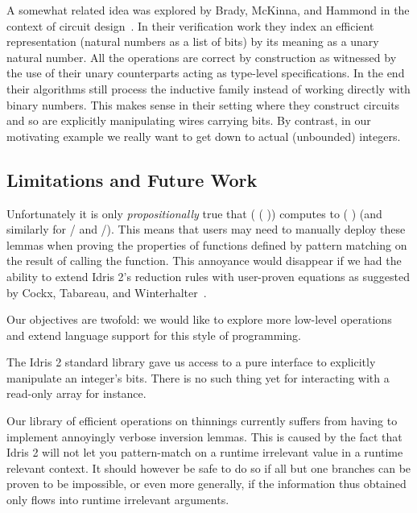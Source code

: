 \documentclass{article}
\newcommand{\idris}{Idris 2}
\begin{document}
A somewhat related idea was explored by Brady, McKinna, and Hammond in the context of
circuit design~\cite{DBLP:conf/sfp/BradyMH07}. In their verification work they index
an efficient representation (natural numbers as a list of bits) by its meaning as a
unary natural number. All the operations are correct by construction as witnessed by
the use of their unary counterparts acting as type-level specifications.
%
In the end their algorithms still process the inductive family instead of working
directly with binary numbers. This makes sense in their setting where they construct
circuits and so are explicitly manipulating wires carrying bits.
%
By contrast, in our motivating example we really want to get down to actual (unbounded)
integers.


\subsection{Limitations and Future Work}

Unfortunately it is only \emph{propositionally} true that
( (  ))
computes to (  ) (and similarly for
/ and /).
%
This means that users may need to manually deploy these lemmas when proving the
properties of functions defined by pattern matching on the result of calling the
 function.
%
This annoyance would disappear if we had the ability to extend \idris{}'s reduction rules
with user-proven equations as suggested by Cockx, Tabareau, and
Winterhalter~\cite{DBLP:journals/pacmpl/CockxTW21}.

Our objectives are twofold: we would like to explore more low-level operations and
extend language support for this style of programming.

The \idris{} standard library gave us access to a pure interface to explicitly
manipulate an integer's bits. There is no such thing yet for interacting with a
read-only array for instance.



Our library of efficient operations on thinnings currently suffers from having to
implement annoyingly verbose inversion lemmas. This is caused by the fact that
\idris{} will not let you pattern-match on a runtime irrelevant value in a runtime
relevant context. It should however be safe to do so if all but one branches can
be proven to be impossible, or even more generally, if the information thus obtained
only flows into runtime irrelevant arguments.



\end{document}
